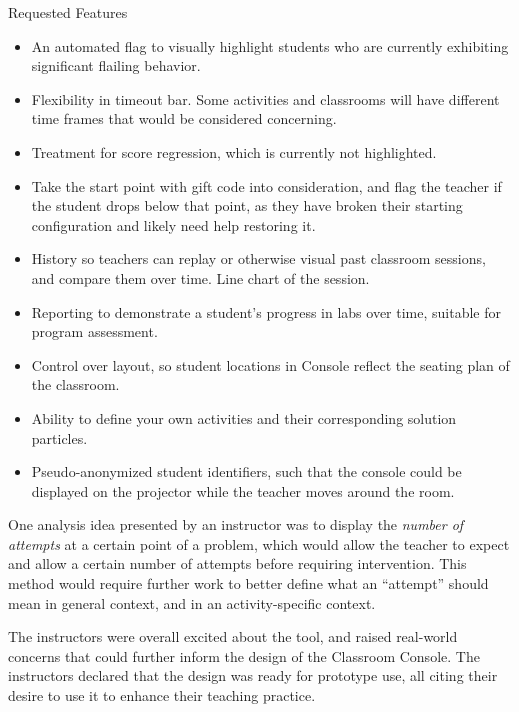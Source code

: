 Requested Features
\begin{itemize}
\item An automated flag to visually highlight students who are currently exhibiting significant flailing behavior.
\item Flexibility in timeout bar. Some activities and classrooms will have different time frames that would be considered concerning.
\item Treatment for score regression, which is currently not highlighted. 
\item Take the start point with gift code into consideration, and flag the teacher if the student drops below that point, as they have broken their starting configuration and likely need help restoring it.
\item History so teachers can replay or otherwise visual past classroom sessions, and compare them over time. Line chart of the session.
\item Reporting to demonstrate a student's progress in labs over time, suitable for program assessment. 
\item Control over layout, so student locations in Console reflect the seating plan of the classroom.
\item Ability to define your own activities and their corresponding solution particles.
\item Pseudo-anonymized student identifiers, such that the console could be displayed on the projector while the teacher moves around the room.
\end{itemize}

One analysis idea presented by an instructor was to display the \emph{number of attempts} at a certain point of a problem, which would allow the teacher to expect and allow a certain number of attempts before requiring intervention. This method would require further work to better define what an ``attempt'' should mean in general context, and in an activity-specific context.

The instructors were overall excited about the tool, and raised real-world concerns that could further inform the design of the Classroom Console. The instructors declared that the design was ready for prototype use, all citing their desire to use it to enhance their teaching practice.


